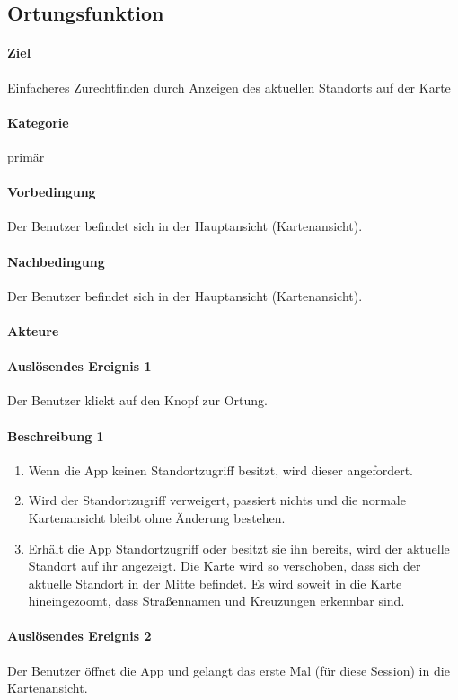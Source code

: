 \subsection{Ortungsfunktion}
\label{Ortungsfunktion}
\paragraph{Ziel}
Einfacheres Zurechtfinden durch Anzeigen des aktuellen Standorts auf der Karte
\paragraph{Kategorie}
primär
\paragraph{Vorbedingung}
Der Benutzer befindet sich in der Hauptansicht (Kartenansicht).
\paragraph{Nachbedingung}
Der Benutzer befindet sich in der Hauptansicht (Kartenansicht).
\paragraph{Akteure}

\paragraph{Auslösendes Ereignis 1}
Der Benutzer klickt auf den Knopf zur Ortung.
\paragraph{Beschreibung 1}
\begin{enumerate}
    \item Wenn die App keinen Standortzugriff besitzt, wird dieser angefordert.
    \item Wird der Standortzugriff verweigert, passiert nichts und die normale Kartenansicht bleibt ohne Änderung bestehen.
    \item Erhält die App Standortzugriff oder besitzt sie ihn bereits, wird der aktuelle Standort auf ihr angezeigt. Die Karte wird so verschoben, dass sich der aktuelle Standort in der Mitte befindet. Es wird soweit in die Karte hineingezoomt, dass Straßennamen und Kreuzungen erkennbar sind.
\end{enumerate}

\paragraph{Auslösendes Ereignis 2}
Der Benutzer öffnet die App und gelangt das erste Mal (für diese Session) in die Kartenansicht.
